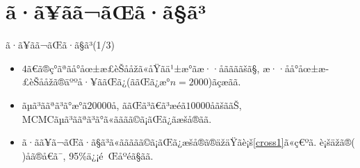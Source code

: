 \documentclass[dvipdfmx]{beamer} %
\begin{document}
\section{ã·ã¥ãã¬ãŒã·ã§ã³}
\begin{frame}{ã·ã¥ãã¬ãŒã·ã§ã³(1/3)}

\begin{itemize}
\item
$4$ã€ã®ç°ãªãå°åœ±æ­£èŠååžã«åŸãä¹±æ°ãæ··åããããšã§, æ··åå°åœ±æ­£èŠååžã®äººå·¥ããŒã¿(ããŒã¿æ°$n=2000$)ãçæãã.

\vspace{0.2cm}
\item
ãµã³ããªã³ã°æ°ã$20000$å, ããŒã³ã€ã³æéã$10000$åãšããŠ, MCMCãµã³ããªã³ã°ã«ãããã©ã¡ãŒã¿ãæšå®ãã.

\vspace{0.2cm}
\item
ã·ãã¥ã¬ãŒã·ã§ã³ã«ããããã©ã¡ãŒã¿æšå®ã®äžäŸãè¡š\ref{cross1}ã«ç€ºã. è¡šäž­ã®( )åã®å€ã¯, 95\%ä¿¡é Œåºéã§ãã.
\end{itemize}



\end{frame}
\end{document}
